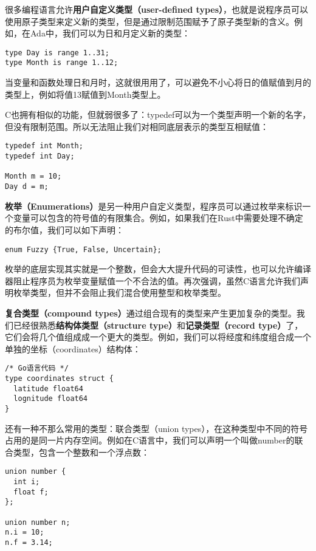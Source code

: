 \documentclass[cn,11pt,chinese]{elegantbook}
\begin{document}
很多编程语言允许\textbf{用户自定义类型（user-defined types）}，也就是说程序员可以使用原子类型来定义新的类型，但是通过限制范围赋予了原子类型新的含义。例如，在Ada中，我们可以为日和月定义新的类型：

\begin{verbatim}
type Day is range 1..31;
type Month is range 1..12;
\end{verbatim}

当变量和函数处理日和月时，这就很用用了，可以避免不小心将日的值赋值到月的类型上，例如将值13赋值到Month类型上。

C也拥有相似的功能，但就弱很多了：typedef可以为一个类型声明一个新的名字，但没有限制范围。所以无法阻止我们对相同底层表示的类型互相赋值：

\begin{verbatim}
typedef int Month;
typedef int Day;

Month m = 10;
Day d = m;
\end{verbatim}

\textbf{枚举（Enumerations）}是另一种用户自定义类型，程序员可以通过枚举来标识一个变量可以包含的符号值的有限集合。例如，如果我们在Rust中需要处理不确定的布尔值，我们可以如下声明：

\begin{verbatim}
enum Fuzzy {True, False, Uncertain};
\end{verbatim}

枚举的底层实现其实就是一个整数，但会大大提升代码的可读性，也可以允许编译器阻止程序员为枚举变量赋值一个不合法的值。再次强调，虽然C语言允许我们声明枚举类型，但并不会阻止我们混合使用整型和枚举类型。

\textbf{复合类型（compound types）}通过组合现有的类型来产生更加复杂的类型。我们已经很熟悉\textbf{结构体类型（structure type）}和\textbf{记录类型（record type）}了，它们会将几个值组成成一个更大的类型。例如，我们可以将经度和纬度组合成一个单独的坐标（coordinates）结构体：

\begin{verbatim}
/* Go语言代码 */
type coordinates struct {
  latitude float64
  lognitude float64
}
\end{verbatim}

还有一种不那么常用的类型：联合类型（union types），在这种类型中不同的符号占用的是同一片内存空间。例如在C语言中，我们可以声明一个叫做number的联合类型，包含一个整数和一个浮点数：

\begin{verbatim}
union number {
  int i;
  float f;
};

union number n;
n.i = 10;
n.f = 3.14;
\end{verbatim}
\end{document}

